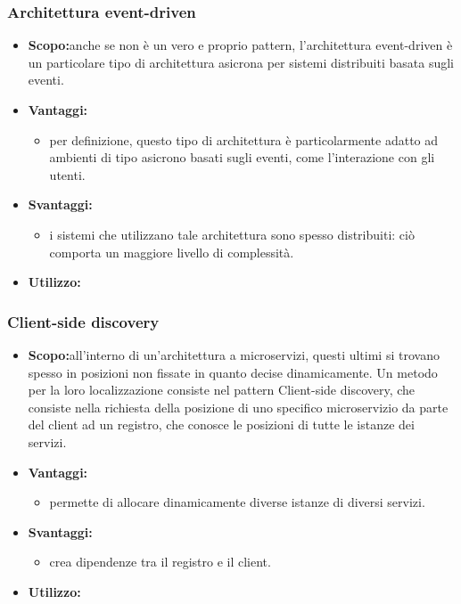     \subsubsection{Architettura event-driven}
      \begin{itemize}
       \item \textbf{Scopo:}anche se non è un vero e proprio pattern, l'architettura event-driven è un particolare tipo di architettura asicrona per sistemi distribuiti basata sugli eventi.
	\item \textbf{Vantaggi:}
	  \begin{itemize}
	   \item per definizione, questo tipo di architettura è particolarmente adatto ad ambienti di tipo asicrono basati sugli eventi, come l'interazione con gli utenti.
	  \end{itemize}
	\item \textbf{Svantaggi:}
	  \begin{itemize}
	   \item i sistemi che utilizzano tale architettura sono spesso distribuiti: ciò comporta un maggiore livello di complessità.
	  \end{itemize}
	\item \textbf{Utilizzo:}
	\end{itemize}
     
     \subsubsection{Client-side discovery}
      \begin{itemize}
       \item \textbf{Scopo:}all'interno di un'architettura a microservizi, questi ultimi si trovano spesso in posizioni non fissate in quanto decise dinamicamente. Un metodo per la loro localizzazione consiste nel pattern Client-side discovery, che consiste nella richiesta della posizione di uno specifico microservizio da parte del client ad un registro, che conosce le posizioni di tutte le istanze dei servizi. 
	\item \textbf{Vantaggi:}
	  \begin{itemize}
	   \item permette di allocare dinamicamente diverse istanze di diversi servizi.
	  \end{itemize}
	\item \textbf{Svantaggi:}
	  \begin{itemize}
	   \item crea dipendenze tra il registro e il client.
	  \end{itemize}
	\item \textbf{Utilizzo:}
	\end{itemize}

